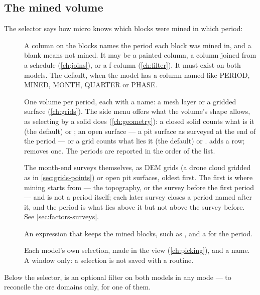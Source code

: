 \subsection{The mined volume}\label{sec:factors-periods}
The  selector says how micro knows which blocks were mined in which period:

\begin{description}
\item[] A column on the blocks names the period each block was mined in, and a blank means not mined. It may be a painted column, a column joined from a schedule (\cref{ch:joins}), or a ƒ column (\cref{ch:filter}). It must exist on both models. The default, when the model has a column named like PERIOD, MINED, MONTH, QUARTER or PHASE.
\item[] One volume per period, each with a name: a mesh layer or a gridded surface (\cref{ch:grids}). The side menu offers what the volume's shape allows, as selecting by a solid does (\cref{ch:geometry}): a closed solid counts what is  it (the default) or ; an open surface — a pit surface as surveyed at the end of the period — or a grid counts what lies  it (the default) or .  adds a row;  removes one. The periods are reported in the order of the list.
\item[]  The month-end surveys themselves, as DEM grids (a drone cloud gridded as in \cref{sec:grids-points}) or open pit surfaces, oldest first. The first is where mining starts from — the topography, or the survey before the first period — and is not a period itself; each later survey closes a period named after it, and the period is what lies above it but not above the survey before. See \cref{sec:factors-surveys}.
\item[] An expression that keeps the mined blocks, such as , and a  for the period.
\item[] Each model's own selection, made in the view (\cref{ch:picking}), and a name. A window only: a selection is not saved with a routine.
\end{description}

Below the selector,  is an optional filter on both models in any mode —  to reconcile the ore domains only,  for one of them.

